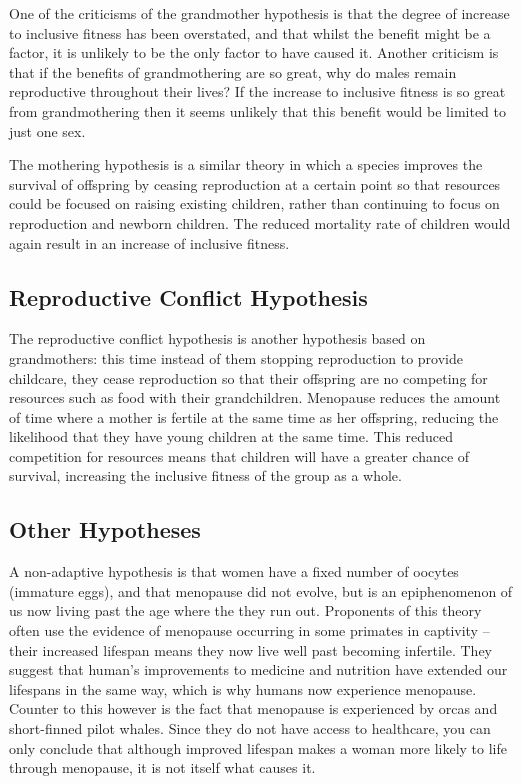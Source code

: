 \documentclass[authoryearcitations]{UoYCSproject}
\begin{document}
One of the criticisms of the grandmother hypothesis is that the degree of increase to inclusive fitness has been overstated, and that whilst the benefit might be a factor, it is unlikely to be the only factor to have caused it. Another criticism is that if the benefits of grandmothering are so great, why do males remain reproductive throughout their lives? If the increase to inclusive fitness is so great from grandmothering then it seems unlikely that this benefit would be limited to just one sex.

The mothering hypothesis is a similar theory in which a species improves the survival of offspring by ceasing reproduction at a certain point so that resources could be focused on raising existing children, rather than continuing to focus on reproduction and newborn children. The reduced mortality rate of children would again result in an increase of inclusive fitness.

\subsection{Reproductive Conflict Hypothesis}
The reproductive conflict hypothesis \cite{cant2008reproductive, repConflictOrca2017} is another hypothesis based on grandmothers: this time instead of them stopping reproduction to provide childcare, they cease reproduction so that their offspring are no competing for resources such as food with their grandchildren. Menopause reduces the amount of time where a mother is fertile at the same time as her offspring, reducing the likelihood that they have young children at the same time. This reduced competition for resources means that children will have a greater chance of survival, increasing the inclusive fitness of the group as a whole.

\subsection{Other Hypotheses}
A non-adaptive hypothesis is that women have a fixed number of oocytes (immature eggs), and that menopause did not evolve, but is an epiphenomenon of us now living past the age where the they run out. \cite{van2003ovarian, cooper1998age} Proponents of this theory often use the evidence of menopause occurring in some primates in captivity -- their increased lifespan means they now live well past becoming infertile. They suggest that human's improvements to medicine and nutrition have extended our lifespans in the same way, which is why humans now experience menopause. Counter to this however is the fact that menopause is experienced by orcas and short-finned pilot whales. Since they do not have access to healthcare, you can only conclude that although improved lifespan makes a woman more likely to life through menopause, it is not itself what causes it.
\end{document}

